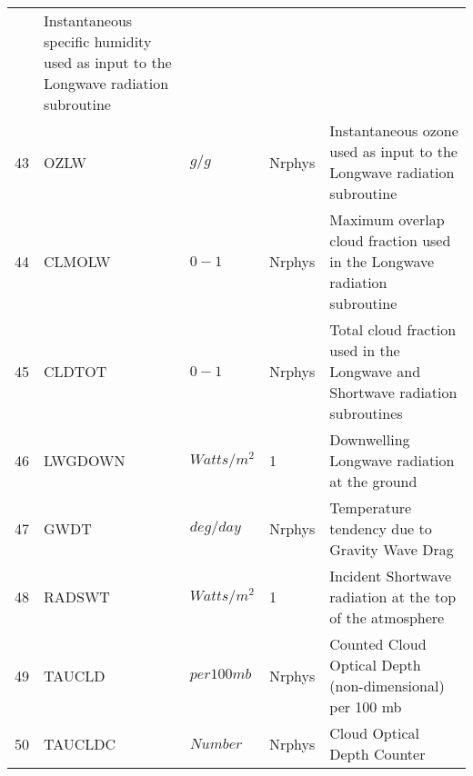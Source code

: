 \begin{tabular}{lllll}
         &\begin{minipage}[t]{3in}
          {Instantaneous specific humidity used as input to the Longwave radiation
          subroutine} 
         \end{minipage}\\
43 & OZLW     &    $g/g$   &  Nrphys 
         &\begin{minipage}[t]{3in}
          {Instantaneous ozone used as input to the Longwave radiation
          subroutine} 
         \end{minipage}\\
44 & CLMOLW   &    $0-1$   &  Nrphys 
         &\begin{minipage}[t]{3in}
          {Maximum overlap cloud fraction used in the Longwave radiation
          subroutine} 
         \end{minipage}\\
45 & CLDTOT   &    $0-1$   &  Nrphys 
         &\begin{minipage}[t]{3in}
          {Total cloud fraction used in the Longwave and Shortwave radiation
          subroutines} 
         \end{minipage}\\
46 & LWGDOWN  &    $Watts/m^2$   &  1 
         &\begin{minipage}[t]{3in}
          {Downwelling Longwave radiation at the ground}
         \end{minipage}\\
47 & GWDT     &    $deg/day$ &  Nrphys
         &\begin{minipage}[t]{3in}
          {Temperature tendency due to Gravity Wave Drag}
         \end{minipage}\\
48 & RADSWT   &    $Watts/m^2$   &  1 
         &\begin{minipage}[t]{3in}
          {Incident Shortwave radiation at the top of the atmosphere}
         \end{minipage}\\
49 & TAUCLD   &    $per 100 mb$   &  Nrphys 
         &\begin{minipage}[t]{3in}
          {Counted Cloud Optical Depth (non-dimensional) per 100 mb}
         \end{minipage}\\
50 & TAUCLDC  &    $Number$   &  Nrphys 
         &\begin{minipage}[t]{3in}
          {Cloud Optical Depth Counter}
         \end{minipage}\\
\end{tabular}
\vfill

